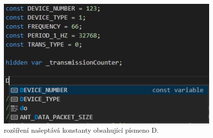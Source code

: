 \begin{figure}[tbh!]
	\centering
	\includegraphics[width=\textwidth,scale=1]{images/constants}
	\caption{rozšíření našeptává konstanty obsahující písmeno D.}
	\label{img:constants}
\end{figure}